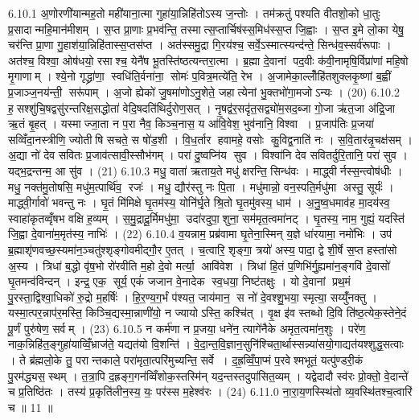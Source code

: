 6.10.1
अ॒णोरणी॑यान्मह॒तो मही॑याना॒त्मा गुहा॑या॒न्निहि॑तोऽस्य ज॒न्तोः । तम॑क्रतुं पश्यति वीतशो॒को धा॒तुः प्र॒सादान्महि॒मान॑मीशम् । स॒प्त प्रा॒णाः प्र॒भव॑न्ति॒ तस्मात्स॒प्तार्चिष॑स्स॒मिध॑स्स॒प्त जि॒ह्वाः । स॒प्त इ॒मे लो॒का येषु॒ चर॑न्ति प्रा॒णा गु॒हाश॑या॒न्निहि॑तास्स॒प्तस॑प्त । अत॑स्समु॒द्रा गि॒रय॑श्च॒ सर्वे॒ऽस्मात्स्यन्द॑न्ते॒ सिन्ध॑व॒स्सर्व॑रूपाः । अत॑श्च॒ विश्वा॒ ओष॑धयो॒ रसाश्च॒ येनै॑ष भू॒तस्ति॑ष्ठत्यन्तरा॒त्मा । ब्र॒ह्मा दे॒वानां पद॒वीः क॑वी॒नामृषि॒र्विप्रा॑णां महि॒षो मृ॒गाणाम् । श्ये॒नो गृद्ध्रा॑णा॒ स्वधि॑ति॒र्वना॑ना॒ सोमः॑ प॒वित्र॒मत्ये॑ति॒ रेभ\sn{} । अ॒जामेका॒ल्लोँहि॑तशुक्लकृ॒ष्णां ब॒ह्वीं प्र॒जाञ्ज॒नय॑न्ती॒ सरू॑पाम् । अ॒जो ह्येको॑ जु॒षमा॑णोऽनु॒शेते॒ जहात्येनां भु॒क्तभो॑गा॒मजोऽन्यः । (20)
6.10.2
ह॒सश्शु॑चि॒षद्वसु॑रन्तरिक्ष॒सद्धोता॑ वेदि॒षदति॑थिर्दुरोण॒सत् । नृ॒षद्व॑र॒सदृ॑त॒सद्व्यो॑म॒सद॒ब्जा गो॒जा ऋ॑त॒जा अ॑द्रि॒जा ऋ॒तं बृ॒हत् । यस्माज्जा॒ता न प॒रा नैव॒ किञ्च॒नास॒ य आ॑वि॒वेश॒ भुव॑नानि॒ विश्वा । प्र॒जाप॑तिः प्र॒जया॑ सव्विँदा॒नस्त्रीणि॒ ज्योतीषि सचते॒ स षो॑ड॒शी । वि॒ध॒र्तार हवामहे॒ वसोः कु॒विद्व॒नाति॑ नः । स॒वि॒तार॑न्नृ॒चक्ष॑सम् । अ॒द्या नो॑ देव सवितः प्र॒जाव॑त्सावी॒स्सौभ॑गम् । परा॑ दु॒ष्वप्नि॑य सुव । विश्वा॑नि देव सवितर्दुरि॒तानि॒ परा॑ सुव । यद्भ॒द्रन्तन्म॒ आ सु॑व । (21)
6.10.3
मधु॒ वाता॑ ऋताय॒ते मधु॑ क्षरन्ति॒ सिन्ध॑वः । माद्ध्वीर्नस्स॒न्त्वोष॑धीः । मधु॒ नक्त॑मु॒तोषसि॒ मधु॑म॒त्पार्थि॑व॒ रजः॑ । मधु॒ द्यौर॑स्तु नः पि॒ता । मधु॑मान्नो॒ वन॒स्पति॒र्मधु॑मा अस्तु॒ सूर्यः॑ । माद्ध्वी॒र्गावो॑ भवन्तु नः । घृ॒तं मि॑मिक्षे घृ॒तम॑स्य॒ योनि॑र्घृ॒ते श्रि॒तो घृ॒तमु॑वस्य॒ धाम॑ । अ॒नु॒ष्व॒धमाव॑ह मा॒दय॑स्व॒ स्वाहा॑कृतव्वृँषभ वक्षि ह॒व्यम् । स॒मु॒द्रादू॒र्मिमधु॑मा॒ उदा॑रदुपा॒शुना॒ सम॑मृत॒त्वमा॑नट् । घृ॒तस्य॒ नाम॒ गुह्यं॒ यदस्ति॑ जि॒ह्वा दे॒वाना॑म॒मृत॑स्य॒ नाभिः॑ । (22)
6.10.4
व॒यन्नाम॒ प्रब्र॑वामा घृ॒तेना॒स्मिन् य॒ज्ञे धा॑रयामा॒ नमो॑भिः । उप॑ ब्र॒ह्माशृ॑णवच्छ॒स्यमा॑न॒ञ्चतु॑श्शृङ्गोवमीद्गौ॒र ए॒तत् । च॒त्वारि॒ शृङ्गा॒ त्रयो॑ अस्य॒ पादा॒ द्वे शी॒र्\mbox{}षे स॒प्त हस्ता॑सो अ॒स्य । त्रिधा॑ ब॒द्धो वृ॑ष॒भो रो॑रवीति म॒हो दे॒वो मर्त्या॒ आवि॑वेश । त्रिधा॑ हि॒तं प॒णिभि॑र्गु॒ह्यमा॑न॒ङ्गवि॑ दे॒वासो॑ घृ॒तमन्व॑विन्दन् । इन्द्र॒ एक॒ सूर्य॒ एकं॑ जजान वे॒नादेक स्व॒धया॒ निष्ट॑तक्षुः । यो दे॒वानां प्रथ॒मं पु॒रस्ता॒द्विश्वा॒धिको॑ रु॒द्रो म॒हर्\mbox{}षिः॑ । हि॒र॒ण्य॒ग॒र्भं प॑श्यत॒ जाय॑मान॒ स नो॑ दे॒वश्शु॒भया॒ स्मृत्या॒ सय्युँ॑नक्तु । यस्मा॒त्पर॒न्नाप॑र॒मस्ति॒ किञ्चि॒द्यस्मा॒न्नाणी॑यो॒ न ज्यायोऽस्ति॒ कश्चि॑त् । वृ॒क्ष इ॑व स्तब्धो दि॒वि ति॑ष्ठ॒त्येक॒स्तेने॒दं पू॒र्णं पुरु॑षेण॒ सर्वम् । (23)
6.10.5
न कर्म॑णा न प्र॒जया॒ धने॑न॒ त्यागे॑नैके अमृत॒त्वमा॑न॒शुः । परे॑ण॒ नाक॒न्निहि॑त॒ङ्गुहा॑याव्विँ॒भ्राज॑ते॒ यद्यत॑यो वि॒शन्ति॑ । वे॒दा॒न्त॒वि॒ज्ञान॒सुनि॑श्चिता॒र्थास्सन्न्या॑सयो॒गाद्यत॑यश्शुद्ध॒सत्वाः । ते ब्र॑ह्मलो॒के तु॒ परान्तकाले॒ परा॑मृता॒त्परि॑मुच्यन्ति॒ सर्वे । द॒ह्र॒व्विँ॒पा॒प्मं प॒रवेश्मभूतं॒ यत्पु॑ण्डरी॒कं पु॒रम॑द्ध्यस॒स्थम् । त॒त्रा॒पि द॒ह्रङ्ग॒गन॑व्विँशोक॒स्तस्मि॑न् यद॒न्तस्तदुपा॑सित॒व्यम् । यद्वेदादौ स्व॑रः प्रो॒क्तो॒ वे॒दान्ते॑ च प्र॒तिष्ठि॑तः । तस्य॑ प्र॒कृति॑लीन॒स्य॒ यः॒ पर॑स्स म॒हेश्व॑रः । (24)
6.11.0
ना॒रा॒य॒णस्स्थि॑तो व्य॒वस्थि॑तश्च॒त्वारि॑ च ॥ 11 ॥
\anuvakamend

